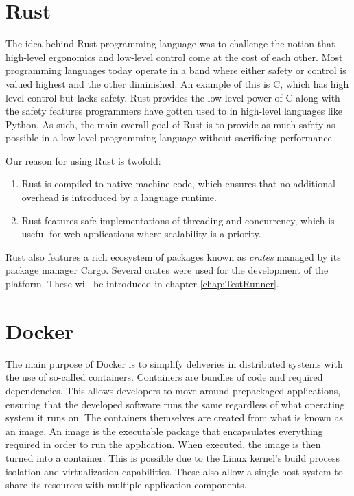 \section{Rust}
The idea behind Rust programming language was to challenge the notion that high-level ergonomics and low-level control come at the cost of each other\cite{Rust_Book}.
Most programming languages today operate in a band where either safety or control is valued highest and the other diminished. An example of this is C, which has high level control but lacks safety.
Rust provides the low-level power of C along with the safety features programmers have gotten used to in high-level languages like Python.
As such, the main overall goal of Rust is to provide as much safety as possible in a low-level programming language without sacrificing performance. \cite{Rust_in_Action}

Our reason for using Rust is twofold:
\begin{enumerate}
    \item Rust is compiled to native machine code, which ensures that no additional overhead is introduced by a language runtime.
    \item Rust features safe implementations of threading and concurrency, which is useful for web applications where scalability is a priority.
\end{enumerate}

Rust also features a rich ecosystem of packages known as \textit{crates} managed by its package manager Cargo\cite{Cargo}. Several crates were used for the development of the platform. These will be introduced in chapter \ref{chap:TestRunner}.

\section{Docker}
The main purpose of Docker is to simplify deliveries in distributed systems with the use of so-called containers\cite{Docker_Container}.
Containers are bundles of code and required dependencies. This allows developers to move around prepackaged applications, ensuring that the developed software runs the same regardless of what operating system it runs on\cite{Docker_Container}.
The containers themselves are created from what is known as an image.
An image is the executable package that encapsulates everything required in order to run the application. When executed, the image is then turned into a container.
This is possible due to the Linux kernel's build process isolation and virtualization capabilities. These also allow a single host system to share its resources with multiple application components\cite{Docker_Container}.

